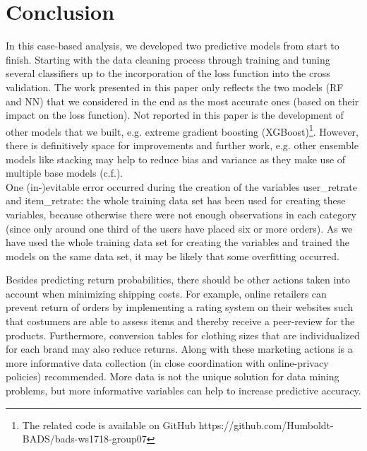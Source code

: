 \documentclass[a4paper,12pt]{article}
\begin{document}
\section{Conclusion}\label{Sec:Conc}


In this case-based analysis, we developed two predictive models from start to finish. Starting with the data cleaning process through training and tuning several classifiers up to the incorporation of the loss function into the cross validation. The work presented in this paper only reflects the two models (RF and NN) that we considered in the end as the most accurate ones (based on their impact on the loss function). Not reported in this paper is the development of other models that we built, e.g. extreme gradient boosting (XGBoost)\footnote{The related code is available on GitHub https://github.com/Humboldt-BADS/bads-ws1718-group07 }. However, there is definitively space for improvements and further work, e.g. other ensemble models like stacking may help to reduce bias and variance as they make use of multiple base models (c.f.\cite{yu2006}). \\
One (in-)evitable error occurred during the creation of the variables user\_retrate and item\_retrate: the whole training data set has been used for creating these variables, because otherwise there were not enough observations in each category (since only around one third of the users have placed six or more orders). As we have used the whole training data set for creating the variables and trained the models on the same data set, it may be likely that some overfitting occurred. 

Besides predicting return probabilities, there should be other actions taken into account when minimizing shipping costs. For example, online retailers can prevent return of orders by implementing a rating system on their websites such that costumers are able to assess items and thereby receive a peer-review for the products. Furthermore, conversion tables for clothing sizes that are individualized for each brand may also reduce returns. Along with these marketing actions is a more informative data collection (in close coordination with online-privacy policies) recommended. More data is not the unique solution for data mining problems, but more informative variables can help to increase predictive accuracy. 

\newpage
%
\nocite{*}
%

\end{document}
